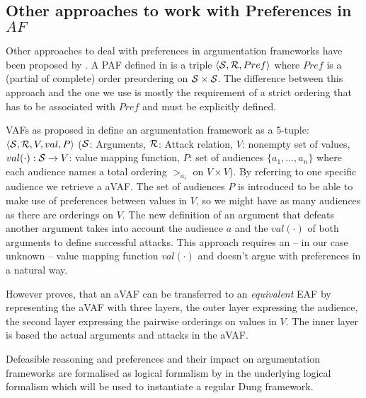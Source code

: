 \subsection{Other approaches to work with Preferences in $AF$}

\label{sub:paf}
Other approaches to deal with preferences in argumentation frameworks have been proposed by \cite{amgoud,amgoud1998,Bench2003,pollock1987, prakken1997}. A \gls{PAF} defined in \cite{amgoud1998} is  a triple $\langle \S, \R, Pref \rangle$ where $Pref$ is a (partial of complete) order preordering on $\S \times \S$. The difference between this approach and the one we use is mostly the requirement of a strict ordering that has to be associated with $Pref$ and must be explicitly defined.
\label{sub:vaf}

\glspl{VAF} as proposed in \cite{Bench2003} define an argumentation framework as a 5-tuple: $\langle \S, \R, V, val, P \rangle$ ($\S$: Arguments, $\R$: Attack relation, $V$: nonempty set of values, $val(\cdot): \S \rightarrow V$: value mapping function, $P$: set of audiences $\{a_1, ..., a_n\}$ where each audience names a total ordering $>_{a_i}$ on $V \times V$). By referring to one specific audience we retrieve a \gls{aVAF}. The set of audiences $P$ is introduced to be able to make use of preferences between values in $V$, so we might have as many audiences as there are orderings on $V$. The new definition of an argument that defeats another argument takes into account the audience $a$ and the $val(\cdot)$ of both arguments to define successful attacks. This approach requires an -- in our case unknown -- value mapping function $val(\cdot)$ and doesn't argue with preferences in a natural way. 

However \cite{Modgil2009} proves, that an \gls{aVAF} can be transferred to an \textit{equivalent} \gls{EAF} by representing the \gls{aVAF} with three layers, the outer layer expressing the audience, the second layer expressing the pairwise orderings on values in $V$. The inner layer is based the actual arguments and attacks in the \gls{aVAF}.

Defeasible reasoning and preferences and their impact on argumentation frameworks are formalised as logical formalism by \cite{pollock1987, prakken1997} in the underlying logical formalism which will be used to instantiate a regular Dung framework.